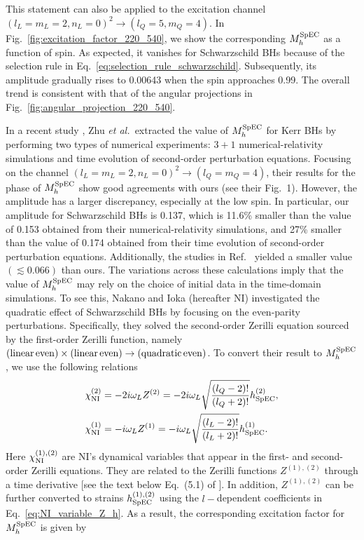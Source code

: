 \documentclass[aps,prd,amsmath,floats,floatfix, twocolumn,
superscriptaddress,nofootinbib,showpacs]{revtex4-1}
\newcommand{\etal}{\textit{et al.\ }}
\begin{document}
This statement can also be applied to the excitation channel  $(l_L=m_L=2,n_L=0)^2 \to (l_Q=5,m_Q=4)$. In Fig.~\ref{fig:excitation_factor_220_540}, we show the corresponding $M_{h}^{\rm SpEC}$ as a function of spin. As expected, it vanishes for Schwarzschild BHs because of the selection rule in Eq.~\eqref{eq:selection_rule_schwarzschild}. Subsequently, its amplitude gradually rises to 0.00643 when the spin approaches 0.99. The overall trend is consistent with that of the angular projections in Fig.~\ref{fig:angular_projection_220_540}.

In a recent study \cite{Zhu:2024rej}, Zhu \etal extracted the value of $M_{h}^{\rm SpEC}$ for Kerr BHs by performing two types of numerical experiments: $3+1$ numerical-relativity simulations and time evolution of second-order perturbation equations. Focusing on the channel $(l_L=m_L=2,n_L=0)^2 \to (l_Q=m_Q=4)$, their results for the phase of $M_{h}^{\rm SpEC}$ show good agreements with ours (see their Fig.~1). However, the amplitude has a larger discrepancy, especially at the low spin. In particular, our amplitude for Schwarzschild BHs is 0.137,  which is 11.6\% smaller than the value of 0.153 obtained from their numerical-relativity simulations, and 27\% smaller than the value of 0.174 obtained from their time evolution of second-order perturbation equations. Additionally, the studies in Ref.~\cite{Redondo-Yuste:2023seq} yielded a smaller value $(\lesssim0.066)$ than ours. The variations across these calculations imply that the value of $M_{h}^{\rm SpEC}$ may rely on the choice of initial data in the time-domain simulations. To see this, Nakano and Ioka (hereafter NI) \cite{Nakano:2007cj} investigated the quadratic effect of Schwarzschild BHs by focusing on the even-parity perturbations. Specifically, they solved the second-order Zerilli equation sourced by the first-order Zerilli function, namely $({\rm linear\, even})\times({\rm linear\, even})\to ({\rm quadratic \, even})$. To convert their result to $M_{h}^{\rm SpEC}$, we use the following relations
\begin{equation}
\label{eq:NI_variable_Z_h}
\begin{aligned}
    &\chi^{(2)}_{\rm NI} = -2i\omega_L Z^{(2)}= -2i\omega_L\sqrt{\frac{(l_Q-2)!}{(l_Q+2)!}} h^{(2)}_{\rm SpEC}, \\
    &\chi^{(1)}_{\rm NI} = -i\omega_L Z^{(1)}= -i\omega_L\sqrt{\frac{(l_L-2)!}{(l_L+2)!}} h^{(1)}_{\rm SpEC}.
\end{aligned}
\end{equation}
Here $\chi^{(1),(2)}_{\rm NI}$ are NI's dynamical variables that appear in the first- and second-order Zerilli equations. They are related to the Zerilli functions $Z^{(1),(2)}$ through a time derivative [see the text below Eq.~(5.1) of \cite{Nakano:2007cj}]. In addition, $Z^{(1),(2)}$ can be further converted to strains $h^{(1),(2)}_{\rm SpEC}$ using the $l-$dependent coefficients in Eq.~\eqref{eq:NI_variable_Z_h}. As a result, the corresponding excitation factor for $M_{h}^{\rm SpEC}$ is given by
\end{document}

